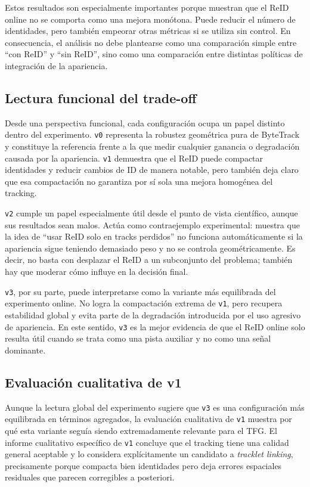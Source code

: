 \documentclass[../MAIN.tex]{subfiles}
\begin{document}
	Estos resultados son especialmente importantes porque muestran que el ReID online no se comporta como una mejora monótona. Puede reducir el número de identidades, pero también empeorar otras métricas si se utiliza sin control. En consecuencia, el análisis no debe plantearse como una comparación simple entre ``con ReID'' y ``sin ReID'', sino como una comparación entre distintas políticas de integración de la apariencia.
	
	\subsection{Lectura funcional del trade-off}
	
	Desde una perspectiva funcional, cada configuración ocupa un papel distinto dentro del experimento. \texttt{v0} representa la robustez geométrica pura de ByteTrack y constituye la referencia frente a la que medir cualquier ganancia o degradación causada por la apariencia. \texttt{v1} demuestra que el ReID puede compactar identidades y reducir cambios de ID de manera notable, pero también deja claro que esa compactación no garantiza por sí sola una mejora homogénea del tracking.
	
	\texttt{v2} cumple un papel especialmente útil desde el punto de vista científico, aunque sus resultados sean malos. Actúa como contraejemplo experimental: muestra que la idea de ``usar ReID solo en tracks perdidos'' no funciona automáticamente si la apariencia sigue teniendo demasiado peso y no se controla geométricamente. Es decir, no basta con desplazar el ReID a un subconjunto del problema; también hay que moderar cómo influye en la decisión final.
	
	\texttt{v3}, por su parte, puede interpretarse como la variante más equilibrada del experimento online. No logra la compactación extrema de \texttt{v1}, pero recupera estabilidad global y evita parte de la degradación introducida por el uso agresivo de apariencia. En este sentido, \texttt{v3} es la mejor evidencia de que el ReID online solo resulta útil cuando se trata como una pista auxiliar y no como una señal dominante.
	
	\subsection{Evaluación cualitativa de v1}
	
	Aunque la lectura global del experimento sugiere que \texttt{v3} es una configuración más equilibrada en términos agregados, la evaluación cualitativa de \texttt{v1} muestra por qué esta variante seguía siendo extremadamente relevante para el TFG. El informe cualitativo específico de \texttt{v1} concluye que el tracking tiene una calidad general aceptable y lo considera explícitamente un candidato a \textit{tracklet linking}, precisamente porque compacta bien identidades pero deja errores espaciales residuales que parecen corregibles a posteriori.
	
\end{document}
